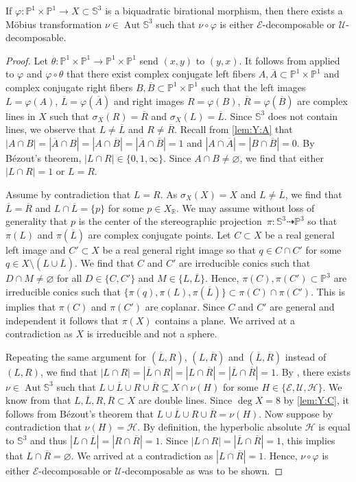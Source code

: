 \documentclass[11pt]{article}
\newcommand{\RL}[2]{\Cref{lem:#1}\ref{lem:#1:#2}}
\newcommand{\R}{\mathbb{R}}
\renewcommand{\P}{\mathbb{P}}
\renewcommand{\S}{\mathbb{S}}
\newcommand{\cE}{\mathcal{E}}
\newcommand{\cU}{\mathcal{U}}
\newcommand{\cH}{\mathcal{H}}
\newcommand{\oA}{{\overline{A}}}
\newcommand{\oB}{{\overline{B}}}
\newcommand{\oL}{{\overline{L}}}
\newcommand{\oR}{{\overline{R}}}
\renewcommand{\c}{\colon}
\newcommand{\dto}{\dasharrow}
\newcommand{\aut}{\operatorname{Aut}}
\newcommand{\Wlog}{without loss of generality }
\newcommand{\st}{such that }
\begin{document}
\begin{proposition}
\label{prp:EU}
If $\varphi\c\P^1\times\P^1\to X\subset \S^3$ is a biquadratic birational morphism,
then there exists a M\"obius transformation $\nu\in\aut\S^3$
\st $\nu\circ\varphi$ is either $\cE$-decomposable or $\cU$-decomposable.
\end{proposition}

\begin{proof}
Let $\theta\c\P^1\times\P^1\to\P^1\times\P^1$ send $(x,y)$ to $(y,x)$.
It follows from  applied to $\varphi$ and $\varphi\circ\theta$
that there exist complex conjugate left fibers $A,\oA\subset\P^1\times\P^1$
and complex conjugate right fibers $B,\oB\subset\P^1\times\P^1$
\st the left images $L=\varphi(A)$, $\oL=\varphi(\oA)$
and right images
$R=\varphi(B)$, $\oR=\varphi(\oB)$
are complex lines in $X$ \st $\sigma_X(R)=\oR$ and $\sigma_X(L)=\oL$.
Since $\S^3$ does not contain lines, we observe that $L\neq\oL$
and $R\neq\oR$.
Recall from \RL{Y}{A} that
$|A\cap B|=|\oA\cap B|=|A\cap\oB|=|\oA\cap\oB|=1$
and $|A\cap\oA|=|B\cap\oB|=0$.
By B\'ezout's theorem, $|L\cap R|\in\{0,1,\infty\}$.
Since $A\cap B\neq\varnothing$, we find that either $|L\cap R|=1$ or $L=R$.

Assume by contradiction that $L=R$. As $\sigma_X(X)=X$ and $L\neq\oL$,
we find that $\oL=\oR$ and $L\cap\oL=\{p\}$ for some $p\in X_\R$.
We may assume \Wlog that $p$ is the center of
the stereographic projection~$\pi\c\S^3\dto\P^3$
so that $\pi(L)$ and $\pi(\oL)$ are complex conjugate points.
Let $C\subset X$ be a real general left image and
$C'\subset X$ be a real general right image so that $q\in C\cap C'$ for some $q\in X\setminus(L\cup\oL)$.
We find that $C$ and $C'$ are irreducible conics
\st $D\cap M\neq\varnothing$ for all $D\in\{C,C'\}$ and $M\in\{L,\oL\}$.
Hence, $\pi(C),\pi(C')\subset\P^3$ are irreducible conics
\st $\{\pi(q),\pi(L),\pi(\oL)\}\subset\pi(C)\cap\pi(C')$. This is implies
that $\pi(C)$ and $\pi(C')$ are coplanar.
Since $C$ and $C'$ are general and independent it follows that
$\pi(X)$ contains a plane. We arrived at a contradiction as $X$ is irreducible and not a sphere.

Repeating the same argument for $(\oL,R)$, $(L,\oR)$ and $(\oL,\oR)$
instead of $(L,R)$,
we find that $|L\cap R|=|\oL\cap R|=|L\cap\oR|=|\oL\cap\oR|=1$.
By , there exists $\nu\in\aut\S^3$ \st
$L\cup\oL\cup R\cup\oR\subseteq X\cap\nu(H)$ for some $H\in\{\cE,\cU,\cH\}$.
We know from  that $L,\oL,R,\oR\subset X$ are double lines.
Since $\deg X=8$ by \RL{Y}{C}, it follows from
B\'ezout's theorem that $L\cup\oL\cup R\cup\oR=\nu(H)$.
Now suppose by contradiction that $\nu(H)=\cH$.
By definition, the hyperbolic absolute $\cH$ is equal to $\S^3$ and thus $|L\cap\oL|=|R\cap\oR|=1$.
Since $|L\cap R|=|\oL\cap\oR|=1$, this implies that $L\cap\oR=\varnothing$.
We arrived at a contradiction as $|L\cap\oR|=1$.
Hence, $\nu\circ\varphi$ is either $\cE$-decomposable or $\cU$-decomposable
as was to be shown.
\end{proof}
\end{document}
